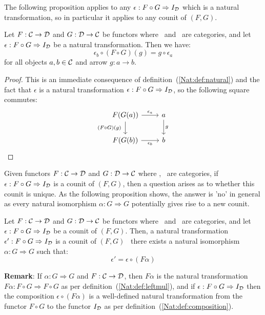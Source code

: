 The following proposition applies to any $\epsilon:F\circ G\Rightarrow I_{\cal D}$ 
which is a natural transformation, so in particular it applies to any counit of
$(F,G)$.
\begin{prop}\label{Adj:prop:counit:natural}
    Let $F:\mbox{$\cal C$}\to\mbox{$\cal D$}$ and $G:\mbox{$\cal D$}\to\mbox{$\cal C$}$ be functors where \Cat\ and \Dat\ 
    are categories, and let $\epsilon:F\circ G\Rightarrow I_{\cal D}$ be a
    natural transformation. Then we have:
        \[
            \epsilon_{b}\circ(F\circ G)(g)=g\circ\epsilon_{a}
        \]
    for all objects $a,b\in\mbox{$\cal C$}$ and arrow $g:a\to b$.
\end{prop}
\begin{proof}
    This is an immediate consequence of definition~(\ref{Nat:def:natural}) 
    and the fact that $\epsilon$ is a natural transformation 
    $\epsilon:F\circ G\Rightarrow I_{\cal D}$, so the following square commutes:
    \[
        \begin{tikzcd}
            F(G(a))\arrow[r, "\epsilon_{a}"]\arrow[d, swap,"(F\circ G)(g)\ "]
            &a\arrow[d, "g"]
            \\
            F(G(b))\arrow[r, swap, "\epsilon_{b}"]
            &b
        \end{tikzcd}
    \]
\end{proof}

Given functors $F:\mbox{$\cal C$}\to\mbox{$\cal D$}$ and $G:\mbox{$\cal D$}\to\mbox{$\cal C$}$ where \Cat, \Dat\ are 
categories, if $\epsilon:F\circ G\Rightarrow I_{\cal D}$ is a counit of $(F,G)$,
then a question arises as to whether this counit is unique. As the following
proposition shows, the answer is 'no' in general as every natural 
isomorphism $\alpha : G\Rightarrow G$ potentially gives rise to a 
new counit.

\begin{prop}\label{Adj:prop:counit:not:unique}
    Let $F:\mbox{$\cal C$}\to\mbox{$\cal D$}$ and $G:\mbox{$\cal D$}\to\mbox{$\cal C$}$ be functors where \Cat\ and \Dat\ 
    are categories, and let $\epsilon:F\circ G\Rightarrow I_{\cal D}$ be a counit
    of $(F,G)$. Then, a natural transformation $\epsilon':F\circ G\Rightarrow 
    I_{\cal D}$ is a counit of $(F,G)$ \ifand\ there exists a natural isomorphism 
    $\alpha:G\Rightarrow G$ such that:
        \[
            \epsilon'=\epsilon\circ(F\alpha)
        \]
\end{prop}

\noindent
{\bf Remark}: If $\alpha: G\Rightarrow G$ and $F:\mbox{$\cal C$}\to\mbox{$\cal D$}$, then $F\alpha$
is the natural transformation $F\alpha:F\circ G\Rightarrow F\circ G$ as per
definition~(\ref{Nat:def:leftmul}), and if $\epsilon:F\circ G\Rightarrow 
I_{\cal D}$ then the composition $\epsilon\circ(F\alpha)$ is a well-defined 
natural transformation from the functor $F\circ G$ to the functor $I_{\cal D}$ 
as per definition~(\ref{Nat:def:composition}).

